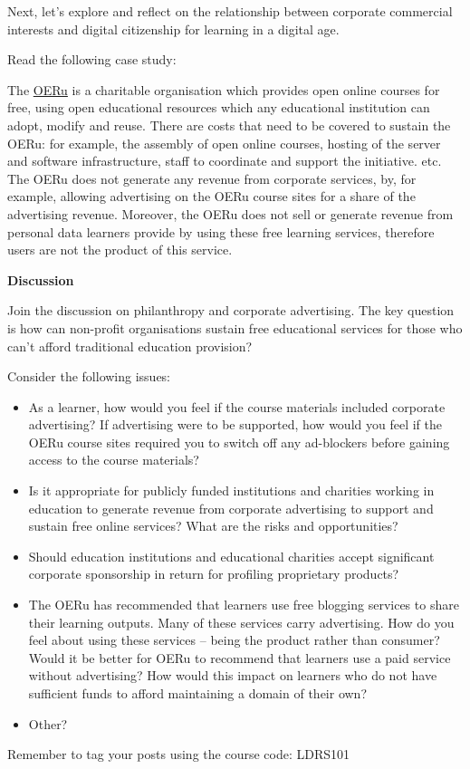 \documentclass[
]{book}
\providecommand{\tightlist}{%
  \setlength{\itemsep}{0pt}\setlength{\parskip}{0pt}}
\theoremstyle{definition}
\theoremstyle{definition}
\theoremstyle{definition}
\theoremstyle{definition}
\theoremstyle{remark}
\begin{document}
\begin{reflect}
Next, let's explore and reflect on the relationship between corporate commercial interests and digital citizenship for learning in a digital age.

Read the following case study:

The \href{https://oeru.org/}{OERu} is a charitable organisation which provides open online courses for free, using open educational resources which any educational institution can adopt, modify and reuse. There are costs that need to be covered to sustain the OERu: for example, the assembly of open online courses, hosting of the server and software infrastructure, staff to coordinate and support the initiative. etc. The OERu does not generate any revenue from corporate services, by, for example, allowing advertising on the OERu course sites for a share of the advertising revenue. Moreover, the OERu does not sell or generate revenue from personal data learners provide by using these free learning services, therefore users are not the product of this service.

\textbf{Discussion}

Join the discussion on philanthropy and corporate advertising. The key question is how can non-profit organisations sustain free educational services for those who can't afford traditional education provision?

Consider the following issues:

\begin{itemize}
\tightlist
\item
  As a learner, how would you feel if the course materials included corporate advertising? If advertising were to be supported, how would you feel if the OERu course sites required you to switch off any ad-blockers before gaining access to the course materials?\\
\item
  Is it appropriate for publicly funded institutions and charities working in education to generate revenue from corporate advertising to support and sustain free online services? What are the risks and opportunities?\\
\item
  Should education institutions and educational charities accept significant corporate sponsorship in return for profiling proprietary products?\\
\item
  The OERu has recommended that learners use free blogging services to share their learning outputs. Many of these services carry advertising. How do you feel about using these services -- being the product rather than consumer? Would it be better for OERu to recommend that learners use a paid service without advertising? How would this impact on learners who do not have sufficient funds to afford maintaining a domain of their own?\\
\item
  Other?
\end{itemize}

Remember to tag your posts using the course code: LDRS101
\end{reflect}
\end{document}
